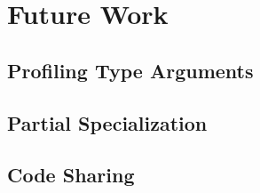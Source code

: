 \chapter{Future Work}

\section{Profiling Type Arguments}

\section{Partial Specialization}

\section{Code Sharing}